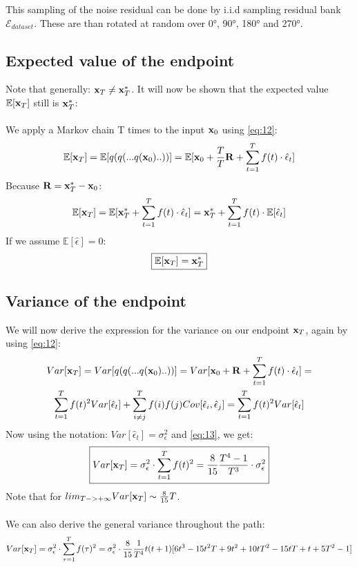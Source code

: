 \documentclass[twocolumn]{article}
\begin{document}
\begin{appendices}
This sampling of the noise residual can be done by i.i.d sampling residual bank $\mathcal{E}_{dataset}$. These are than rotated at random over 0°, 90°, 180° and 270°. 

\subsection{Expected value of the endpoint}
Note that generally: $\bold{x}_T \neq \bold{x}_T^*$. It will now be shown that the expected value $\mathbb{E}[\bold{x}_T]$ still is $\bold{x}_T^*$:\\
\\
We apply a Markov chain T times to the input $\bold{x}_0$ using \ref{eq:12}:\\
\begin{equation}
    \mathbb{E}[\bold{x}_T] = \mathbb{E}[q(q(...q(\bold{x}_0)..))] = \mathbb{E}[\bold{x}_0 + \frac{T}{T} \bold{R} + \sum_{t=1}^{T} f(t) \cdot \hat{\epsilon}_t] 
\end{equation}
Because $\bold{R}= \bold{x}_T^* - \bold{x}_0$:
\begin{equation}
    \mathbb{E}[\bold{x}_T] = \mathbb{E}[\bold{x}_T^* + \sum_{t=1}^{T} f(t) \cdot \hat{\epsilon}_t] = \bold{x}_T^* + \sum_{t=1}^{T} f(t) \cdot \mathbb{E}[\hat{\epsilon}_t]
\end{equation}
If we assume $\mathbb{E}[\hat{\epsilon}] = 0$:
\begin{equation}
    \boxed{\mathbb{E}[\bold{x}_T] = \bold{x}_T^*}
\end{equation}

\subsection{Variance of the endpoint}
We will now derive the expression for the variance on our endpoint $\bold{x}_T$, again by using \ref{eq:12}:
\begin{multline}
    Var[\bold{x}_T] = Var[q(q(...q(\bold{x}_0)..))] = Var[\bold{x}_0 + \bold{R} + \sum_{t=1}^{T} f(t) \cdot \hat{\epsilon}_t] = \\ \sum_{t=1}^{T} f(t)^2 Var[\hat{\epsilon}_t] + \sum_{i \neq j}^{T} f(i) f(j) Cov[\hat{\epsilon}_i, \hat{\epsilon}_j] = \sum_{t=1}^{T} f(t)^2 Var[\hat{\epsilon}_t]
\end{multline}
Now using the notation: $Var[\hat{\epsilon}_t] = \sigma_{\epsilon}^2$ and \ref{eq:13}, we get:
\begin{equation}
    \boxed{Var[\bold{x}_T] = \sigma_{\epsilon}^2 \cdot \sum_{t=1}^{T} f(t)^2 = \frac{8}{15} \frac{T^4 - 1}{T^3} \cdot \sigma_{\epsilon}^2}
\end{equation}
Note that for $lim_{T->+\infty} Var[\bold{x}_T] \sim \frac{8}{15} T$.\\
\\
We can also derive the general variance throughout the path:
\begin{multline}
    Var[\bold{x}_T] = \sigma_{\epsilon}^2 \cdot \sum_{\tau=1}^{T} f(\tau)^2 = \sigma_{\epsilon}^2 \cdot \frac{8}{15} \frac{1}{T^4} t(t+1)[6t^3 - 15t^2T + 9t^2 + 10tT^2 - 15tT + t + 5T^2 - 1]
\end{multline}
    


\end{appendices}
\end{document}
